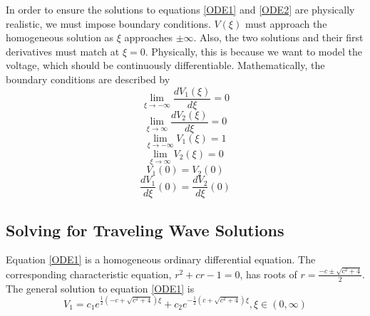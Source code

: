 \documentclass[11pt, oneside]{article}   	%
\begin{document}
In order to ensure the solutions to equations \ref{ODE1} and \ref{ODE2} are physically realistic, we must impose boundary conditions. $V(\xi)$ must approach the homogeneous solution as $\xi$ approaches $\pm \infty$. Also, the two solutions and their first derivatives must match at $\xi=0$. Physically, this is because we want to model the voltage, which should be continuously differentiable. Mathematically, the boundary conditions are described by\\
$$\lim_{\xi\to-\infty} \frac{d V_1(\xi)}{d \xi}=0$$
$$\lim_{\xi\to\infty} \frac{d V_2(\xi)}{d \xi}=0$$
$$\lim_{\xi\to-\infty} V_1(\xi)=1$$
$$\lim_{\xi\to\infty} V_2(\xi)=0$$
$$V_1(0)=V_2(0)$$
$$\frac{d V_1}{d \xi}(0)=\frac{d V_2}{d \xi}(0)$$


\subsection{Solving for Traveling Wave Solutions}

Equation \ref{ODE1} is a homogeneous ordinary differential equation. The corresponding characteristic equation, $r^2+cr-1=0$, has roots of  $r=\frac{-c \pm \sqrt{c^2+4}}{2}$. The general solution to equation \ref{ODE1} is 
\begin{equation}
\label{ODE1 general solution}
V_{1}=c_1 e^{\frac{1}{2}(-c+\sqrt{c^2+4})\xi}+c_2e^{-\frac{1}{2}(c+\sqrt{c^2+4})\xi}, \xi \in (0,\infty)
\end{equation}
\end{document}
